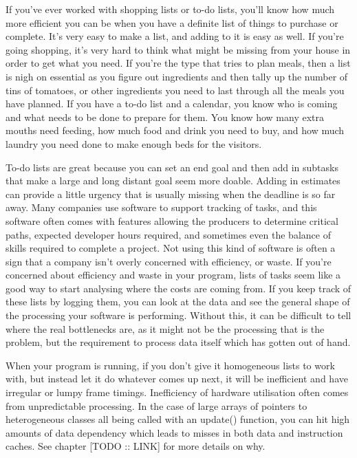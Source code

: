 \documentclass[a4paper,12pt]{article}
\begin{document}
If you've ever worked with shopping lists or to-do lists, you'll know how much more efficient you can be when you have a definite list of things to purchase or complete.
It's very easy to make a list, and adding to it is easy as well.
If you're going shopping, it's very hard to think what might be missing from your house in order to get what you need.
If you're the type that tries to plan meals, then a list is nigh on essential as you figure out ingredients and then tally up the number of tins of tomatoes, or other ingredients you need to last through all the meals you have planned.
If you have a to-do list and a calendar, you know who is coming and what needs to be done to prepare for them.
You know how many extra mouths need feeding, how much food and drink you need to buy, and how much laundry you need done to make enough beds for the visitors.

To-do lists are great because you can set an end goal and then add in subtasks that make a large and long distant goal seem more doable.
Adding in estimates can provide a little urgency that is usually missing when the deadline is so far away.
Many companies use software to support tracking of tasks, and this software often comes with features allowing the producers to determine critical paths, expected developer hours required, and sometimes even the balance of skills required to complete a project.
Not using this kind of software is often a sign that a company isn't overly concerned with efficiency, or waste.
If you're concerned about efficiency and waste in your program, lists of tasks seem like a good way to start analysing where the costs are coming from.
If you keep track of these lists by logging them, you can look at the data and see the general shape of the processing your software is performing.
Without this, it can be difficult to tell where the real bottlenecks are, as it might not be the processing that is the problem, but the requirement to process data itself which has gotten out of hand.

When your program is running, if you don't give it homogeneous lists to work with, but instead let it do whatever comes up next, it will be inefficient and have irregular or lumpy frame timings.
Inefficiency of hardware utilisation often comes from unpredictable processing.
In the case of large arrays of pointers to heterogeneous classes all being called with an update() function, you can hit high amounts of data dependency which leads to misses in both data and instruction caches.
See chapter [TODO :: LINK] for more details on why.
\end{document}
